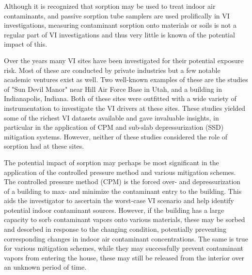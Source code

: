 Although it is recognized that sorption may be used to treat indoor air contaminants, and passive sorption tube samplers are used prolifically in VI investigations, measuring contaminant sorption onto materials or soils is not a regular part of VI investigations and thus very little is known of the potential impact of this\cite{u.s._environmental_protection_agency_oswer_2015}.\par

Over the years many VI sites have been investigated for their potential exposure risk.
Most of these are conducted by private industries but a few notable academic ventures exist as well.
Two well-known examples of these are the studies of "Sun Devil Manor" near Hill Air Force Base in Utah, and a building in Indianapolis, Indiana.
Both of these sites were outfitted with a wide variety of instrumentation to investigate the VI drivers at these sites.
These studies yielded some of the richest VI datasets available and gave invaluable insights, in particular in the application of CPM\cite{holton_long-term_2015} and sub-slab depressurization (SSD) mitigation systems\cite{lutes_comparing_2015,u.s._environmental_protection_agency_assessment_2015}.
However, neither of these studies considered the role of sorption had at these sites.\par

The potential impact of sorption may perhaps be most significant in the application of the controlled pressure method and various mitigation schemes.
The controlled pressure method (CPM) is the forced over- and depressurization of a building to max- and minimize the contaminant entry to the building.
This aids the investigator to ascertain the worst-case VI scenario and help identify potential indoor contaminant sources\cite{mchugh_recent_2017,holton_long-term_2015}.
However, if the building has a large capacity to sorb contaminant vapors onto various materials, these may be sorbed and desorbed in response to the changing condition, potentially preventing corresponding changes in indoor air contaminant concentrations.
The same is true for various mitigation schemes, while they may successfully prevent contaminant vapors from entering the house, these may still be released from the interior over an unknown period of time\cite{meininghaus_diffusion_2000,meininghaus_diffusion_2002}.\par

